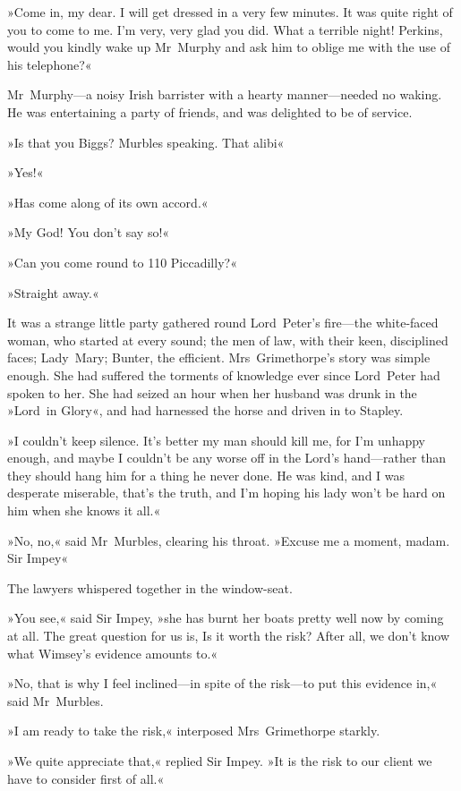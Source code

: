 »Come in, my dear. I will get dressed in a very few minutes. It was quite right of you to come to me. I'm very, very glad you did. What a terrible night! Perkins, would you kindly wake up Mr~Murphy and ask him to oblige me with the use of his telephone?«

Mr~Murphy—a noisy Irish barrister with a hearty manner—needed no waking. He was entertaining a party of friends, and was delighted to be of service.

»Is that you Biggs? Murbles speaking. That alibi\longdash«

»Yes!«

»Has come along of its own accord.«

»My God! You don't say so!«

»Can you come round to 110 Piccadilly?«

»Straight away.«

It was a strange little party gathered round Lord~Peter's fire—the white-faced woman, who started at every sound; the men of law, with their keen, disciplined faces; Lady~Mary; Bunter, the efficient. Mrs~Grimethorpe's story was simple enough. She had suffered the torments of knowledge ever since Lord~Peter had spoken to her. She had seized an hour when her husband was drunk in the »Lord~in Glory«, and had harnessed the horse and driven in to Stapley.

»I couldn't keep silence. It's better my man should kill me, for I'm unhappy enough, and maybe I couldn't be any worse off in the Lord's hand—rather than they should hang him for a thing he never done. He was kind, and I was desperate miserable, that's the truth, and I'm hoping his lady won't be hard on him when she knows it all.«

»No, no,« said Mr~Murbles, clearing his throat. »Excuse me a moment, madam. Sir Impey\longdash«

The lawyers whispered together in the window-seat.

»You see,« said Sir Impey, »she has burnt her boats pretty well now by coming at all. The great question for us is, Is it worth the risk? After all, we don't know what Wimsey's evidence amounts to.«

»No, that is why I feel inclined—in spite of the risk—to put this evidence in,« said Mr~Murbles.

»I am ready to take the risk,« interposed Mrs~Grimethorpe starkly.

»We quite appreciate that,« replied Sir Impey. »It is the risk to our client we have to consider first of all.«

